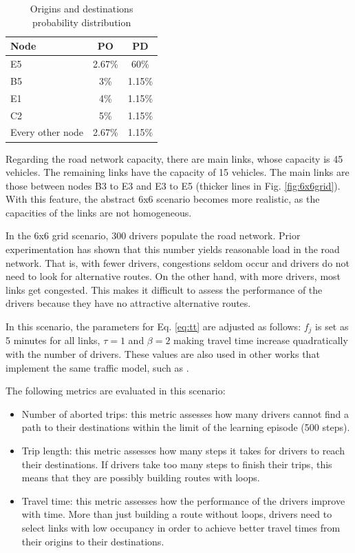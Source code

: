 \documentclass{RITA}
\newcommand{\fftt}{\ensuremath{f_j}} 		%
\begin{document}
{%
\begin{table}[ht]
\begin{center}
\begin{tabular}{|l|c|c|} \hline
Node & PO & PD \\ \hline
E5 & 2.67\% & 60\% \\ \hline
B5 & 3\% & 1.15\% \\ \hline
E1 & 4\% & 1.15\% \\ \hline
C2 & 5\% & 1.15\% \\ \hline
Every other node & 2.67\% & 1.15\% \\ \hline
\end{tabular}
\caption{Origins and destinations probability distribution}\label{tab:odprob}
\end{center}
\end{table}
}%
Regarding the road network capacity, there are main links, whose capacity is 45 vehicles. The remaining links have the capacity of 15 vehicles. The main links are those between nodes B3 to E3 and E3 to E5 (thicker lines in Fig. \ref{fig:6x6grid}). With this feature, the abstract 6x6 scenario becomes more realistic, as the capacities of the links are not homogeneous.

In the 6x6 grid scenario, 300 drivers populate the road network. Prior experimentation has shown that this number yields reasonable load in the road network. That is, with fewer drivers, congestions seldom occur and drivers do  not need to look for alternative routes. On the other hand, with more drivers, most links get congested. This  makes it difficult to assess the performance of the drivers because they have no attractive alternative routes.

In this scenario, the parameters for Eq. \eqref{eq:tt} are adjusted as follows: $\fftt$ is set as 5 minutes for all links, $\tau = 1$ and $\beta = 2$ making travel time increase quadratically with the number of drivers. These values are also used in other works that implement the same traffic model, such as \cite{Galib&Moser2011,Tavares&Bazzan2012,Tavares&Bazzan2012bwss}.

The following metrics are evaluated in this scenario:

\begin{itemize}
  \item Number of aborted trips: this metric assesses how many drivers cannot find a path to their destinations within the limit of the learning episode (500 steps).
  \item Trip length: this metric assesses how many steps it takes for drivers to reach their destinations. If drivers take too many steps to finish their trips, this means that they are possibly building routes with loops.
 \item Travel time: this metric assesses how the performance of the drivers improve with time. More than just building a route without loops, drivers need to select links with low occupancy in order to achieve better travel times from their origins to their destinations.
\end{itemize}
\end{document}
